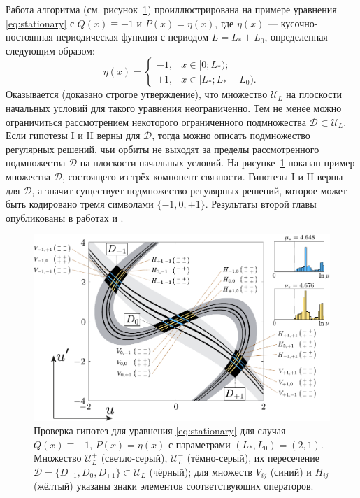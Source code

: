\documentclass[candidate, href, colorlinks]{disser}
\begin{document}
Работа алгоритма (см. рисунок~\ref{fig:hypotheses-validation}) проиллюстрирована на примере уравнения \eqref{eq:stationary} с $Q(x) \equiv -1$ и $P(x) = \eta(x)$, где $\eta(x)$ --- кусочно-постоянная периодическая функция с периодом $L = L_* + L_0$, определенная следующим образом:
\begin{equation}
	\eta(x) = \left\{
		\begin{array}{rl}
			-1, & x \in [0; L_*); \\
			+1, & x \in [L_*; L_* + L_0).
		\end{array}
	\right.
\label{eq:eta}
\end{equation}
Оказывается (доказано строгое утверждение), что множество $\mathscr{U}_L$ на плоскости начальных условий для такого уравнения неограниченно.
Тем не менее можно ограничиться рассмотрением некоторого ограниченного подмножества $\mathcal{D} \subset \mathscr{U}_L$.
Если гипотезы I и II верны для $\mathcal{D}$, тогда можно описать подмножество регулярных решений, чьи орбиты не выходят за пределы рассмотренного подмножества $\mathcal{D}$ на плоскости начальных условий.
На рисунке~\ref{fig:hypotheses-validation} показан пример множества $\mathcal{D}$, состоящего из трёх компонент связности.
Гипотезы I и II верны для $\mathcal{D}$, а значит существует подмножество регулярных решений, которое может быть кодировано тремя символами $\{-1, 0, +1\}$.
Результаты второй главы опубликованы в работах \cite{Bannoe2019} и \cite{Bannoe2021}.

\begin{figure}[h]
\centering
	\includegraphics[scale = 1]{../pic/hypotheses for piecewise equation}
	\caption{
		Проверка гипотез для уравнения \eqref{eq:stationary} для случая $Q(x) \equiv -1$, $P(x) = \eta(x)$ с параметрами $(L_*, L_0) = (2, 1)$.
		Множество $\mathscr{U}_L^+$ (светло-серый), $\mathscr{U}_L^-$ (тёмно-серый), их пересечение $\mathcal{D} = \{ D_{-1}, D_0, D_{+1} \} \subset \mathscr{U}_L$ (чёрный); для множеств $V_{ij}$ (синий) и $H_{ij}$ (жёлтый) указаны знаки элементов соответствующих операторов.
	}
\label{fig:hypotheses-validation}
\end{figure}
\end{document}
